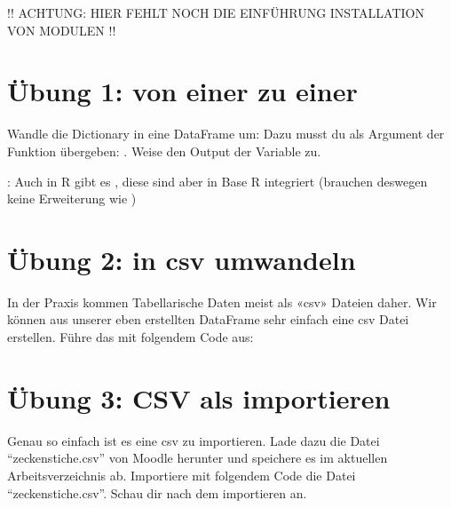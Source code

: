 \documentclass[letterpaper,10pt,english]{sphinxmanual}
\begin{document}
!! ACHTUNG: HIER FEHLT NOCH DIE EINFÜHRUNG INSTALLATION VON MODULEN !!


\section{Übung 1: von einer  zu einer }
\label{\detokenize{01_04_Tabellarische_Daten:ubung-1-von-einer-dictionary-zu-einer-dataframe}}
Wandle die Dictionary  in eine DataFrame um: Dazu musst du  als Argument der Funktion  übergeben: . Weise den Output der Variable  zu.

: Auch in R gibt es , diese sind aber in Base R integriert (brauchen deswegen keine Erweiterung wie )


\section{Übung 2:  in csv umwandeln}
\label{\detokenize{01_04_Tabellarische_Daten:ubung-2-dataframe-in-csv-umwandeln}}
In der Praxis kommen Tabellarische Daten meist als «csv» Dateien daher. Wir können aus unserer eben erstellten DataFrame sehr einfach eine csv Datei erstellen. Führe das mit folgendem Code aus:

\begin{sphinxVerbatim}[commandchars=\\\{\}]
\end{sphinxVerbatim}


\section{Übung 3: CSV als  importieren}
\label{\detokenize{01_04_Tabellarische_Daten:ubung-3-csv-als-dataframe-importieren}}
Genau so einfach ist es eine csv zu importieren. Lade dazu die Datei “zeckenstiche.csv” von Moodle herunter und speichere es im aktuellen Arbeitsverzeichnis ab. Importiere mit folgendem Code die Datei “zeckenstiche.csv”. Schau dir  nach dem importieren an.
\end{document}
